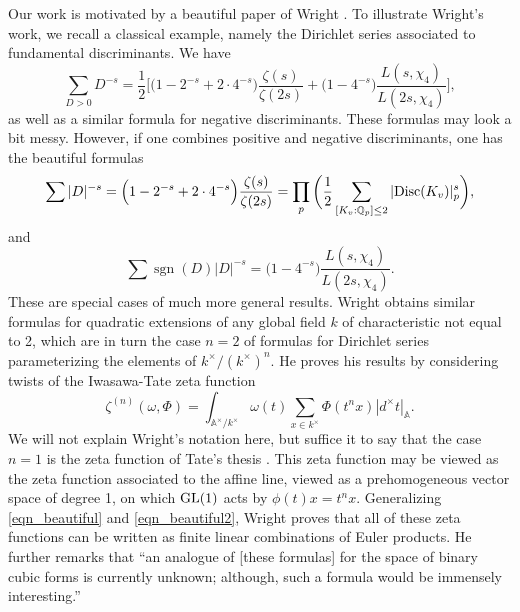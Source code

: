 \documentclass[12pt]{amsart}
\theoremstyle{remark}
\numberwithin{theorem}{section} \numberwithin{equation}{section}
\newcommand{\Q}{\mathbb{Q}}
\newcommand{\GL}{{\text {\rm GL}}}
\newcommand{\sgn}{\operatorname{sgn}}
\newcommand{\Disc}{\textnormal{Disc}}
\newcommand{\A}{\mathbb{A}}
\begin{document}
Our work is motivated by a beautiful paper of Wright \cite{W}. To illustrate Wright's work, we recall a
classical example, namely the Dirichlet series associated to fundamental discriminants. We
have
\begin{equation}
\sum_{D > 0} D^{-s} = \frac{1}{2} \bigg[ \big(1 - 2^{-s} + 2 \cdot 4^{-s}\big) \frac{\zeta(s)}{\zeta(2s)} +
\big( 1 - 4^{-s} \big) \frac{L(s, \chi_4)}{L(2s, \chi_4)}\bigg],
\end{equation}
as well as a similar formula for negative discriminants. These formulas may look a bit messy.
However, if one combines positive and negative discriminants, one has the beautiful formulas
\begin{equation}\label{eqn_beautiful}
\sum |D|^{-s} = \Big( 1 - 2^{-s} + 2 \cdot 4^{-s}\Big) \frac{\zeta(s)}{\zeta(2s)} =
\prod_p \bigg( \frac{1}{2} \sum_{[K_v : \Q_p] \leq 2} |\Disc(K_v)|_p^s \bigg),
\end{equation}
and
\begin{equation}\label{eqn_beautiful2}
\sum \sgn(D) |D|^{-s} = \Big( 1 - 4^{-s}\Big) \frac{L(s, \chi_4)}{L(2s, \chi_4)}.
\end{equation}
These are special cases of much more general results. Wright obtains similar formulas for quadratic
extensions of any global field $k$ of characteristic not equal to 2, which are in turn the case $n = 2$ of formulas
for Dirichlet series parameterizing the elements of $k^{\times}/(k^{\times})^n$. He proves his results by considering 
twists of the Iwasawa-Tate zeta function
\begin{equation}\label{eqn_it}
\zeta^{(n)}(\omega, \Phi) = \int_{\A^{\times} / k^{\times}} \omega(t) \sum_{x \in k^{\times}} \Phi(t^n x) |d^{\times} t|_{\A}.
\end{equation}
We will not explain Wright's notation here, but suffice it to say that the case $n = 1$ is the zeta function of
Tate's thesis \cite{tate}. This zeta function may be viewed as the zeta function associated to the affine line, viewed as a
prehomogeneous vector space of degree 1, on which $\GL(1)$ acts by $\phi(t) x = t^n x$. 
Generalizing \eqref{eqn_beautiful} and \eqref{eqn_beautiful2},
Wright proves 
that all of these zeta functions can be written as finite linear combinations of Euler products.
He further remarks that ``an analogue of [these formulas] for the space of binary cubic
forms is currently unknown; although, such a formula would be immensely interesting.''
\end{document}
